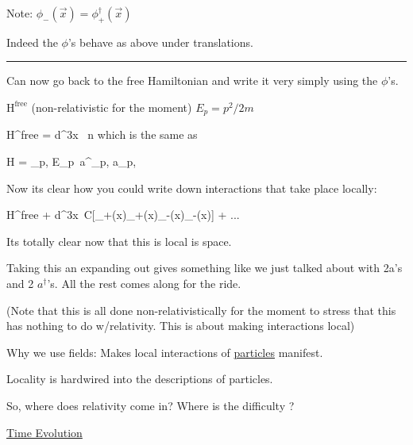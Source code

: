 {Note: $\phi_- (\vec{x}) = \phi^\dagger_+ (\vec{x})$

Indeed the $\phi$'s behave as above under translations.

\noindent\rule{\textwidth}{1pt}

Can now go back to the free Hamiltonian and write it very simply using the $\phi$'s.


$\textrm{H}^{\textrm{free}}$ (non-relativistic for the moment) $E_p = p^2/2m$

\be
\textrm{H}^{\textrm{free}} = \int d^3x\ 
\ee
n
which is the same as 

\be
H = \sum\limits_{p,\sigma} E_p\ a^\dagger_{p,\sigma} a_{p,\sigma}
\ee


Now its clear how you could write down interactions that take place locally:

\be
\textrm{H}^{\textrm{free}} + \int d^3x\ C[\phi_+(x)\phi_+(x)\phi_-(x)\phi_-(x)] + ... 
\ee

Its totally clear now that this is local is space. 

Taking this an expanding out gives something like we just talked about with 2a's and 2 $a^\dagger$'s.
All the rest comes along for the ride. 

(Note that this is all done non-relativistically for the moment to stress that this has nothing to do w/relativity.
This is about making interactions local)

Why we use fields: Makes local interactions of \underline{particles} manifest.

Locality is hardwired into the descriptions of particles.

So, where does relativity come in?  Where is the difficulty ?

\underline{Time Evolution}

}
